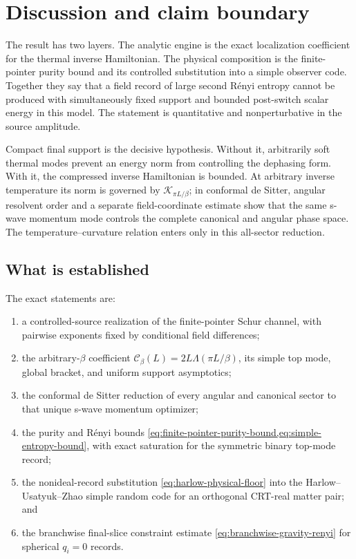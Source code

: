 \section{Discussion and claim boundary}
\label{sec:discussion}

The result has two layers.  The analytic engine is the exact localization
coefficient for the thermal inverse Hamiltonian.  The physical composition is
the finite-pointer purity bound and its controlled substitution into a simple
observer code.
Together they say that a field record of large second R\'enyi entropy cannot be
produced with simultaneously fixed support and bounded post-switch scalar
energy in this model.  The statement is quantitative and nonperturbative in
the source amplitude.

Compact final support is the decisive hypothesis.  Without it, arbitrarily
soft thermal modes prevent an energy norm from controlling the dephasing
form.  With it, the compressed inverse Hamiltonian is bounded.  At arbitrary
inverse temperature its norm is governed by
$\mathcal K_{\pi L/\beta}$; in conformal de Sitter, angular resolvent order and
a separate field-coordinate estimate show that the same s-wave momentum mode
controls the complete canonical and angular phase space.  The
temperature--curvature relation enters only in this all-sector reduction.

\subsection{What is established}

The exact statements are:
\begin{enumerate}[leftmargin=*,itemsep=2pt]
 \item a controlled-source realization of the finite-pointer Schur channel,
 with pairwise exponents fixed by conditional field differences;
 \item the arbitrary-$\beta$ coefficient
 $\mathcal C_\beta(L)=2L\Lambda(\pi L/\beta)$, its simple top mode, global
 bracket, and uniform support asymptotics;
 \item the conformal de Sitter reduction of every angular and canonical sector
 to that unique s-wave momentum optimizer;
 \item the purity and R\'enyi bounds
 \cref{eq:finite-pointer-purity-bound,eq:simple-entropy-bound}, with exact
 saturation for the symmetric binary top-mode record;
 \item the nonideal-record substitution
 \cref{eq:harlow-physical-floor} into the Harlow--Usatyuk--Zhao simple random
 code for an orthogonal CRT-real matter pair; and
 \item the branchwise final-slice constraint estimate
 \cref{eq:branchwise-gravity-renyi} for spherical $q_i=0$ records.
\end{enumerate}


